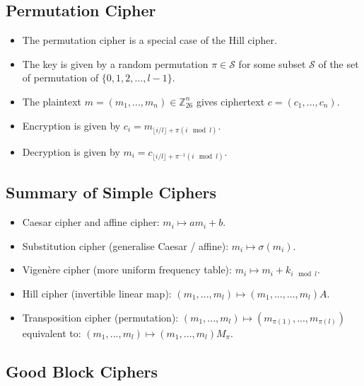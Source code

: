 \documentclass[a4paper]{scrartcl}
\begin{document}
\subsection*{Permutation Cipher}

\begin{itemize}
\item The permutation cipher is a special case of the Hill cipher.
\item The key is given by a random permutation $\pi \in \mathcal{S}$ for some subset $\mathcal{S}$ of the set of permutation of $\{0, 1, 2, ..., l -1\}$.
\item The plaintext $m = (m_1, ..., m_n) \in \mathbb{Z}_{26}^{n}$ gives ciphertext $c = (c_1, ..., c_n)$.
\item Encryption is given by $c_i = m_{\lfloor i / l \rfloor + \pi (i \mod l)}$.
\item Decryption is given by $m_i = c_{\lfloor i / l \rfloor + \pi^{-1} (i \mod l)}$.
\end{itemize}

\subsection*{Summary of Simple Ciphers}

\begin{itemize}
\item Caesar cipher and affine cipher: $m_i \mapsto am_i + b$.
\item Substitution cipher (generalise Caesar / affine): $m_i \mapsto \sigma(m_i)$.
\item Vigenère cipher (more uniform frequency table): $m_i \mapsto m_i + k_{i \mod l}$.
\item Hill cipher (invertible linear map): $(m_1, ..., m_l) \mapsto (m_1, ..., ..., m_l)A$.
\item Transposition cipher (permutation): $(m_1, ..., m_l) \mapsto (m_{\pi(1)}, ..., m_{\pi(l)})$\\
equivalent to: $(m_1, ..., m_l) \mapsto (m_1, ..., m_l)M_\pi$.
\end{itemize}

\subsection*{Good Block Ciphers}
\end{document}
